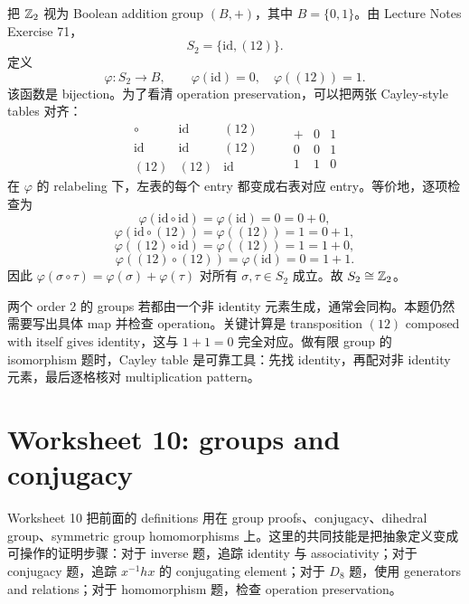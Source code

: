 \begin{solution}
把 \(\mathbb{Z}_2\) 视为 Boolean addition group \((B,+)\)，其中 \(B=\{0,1\}\)。由 Lecture Notes Exercise 71，
\[
  S_2=\{\mathrm{id},(12)\}.
\]
定义
\[
  \varphi:S_2\to B,\qquad
  \varphi(\mathrm{id})=0,\quad \varphi((12))=1.
\]
该函数是 bijection。为了看清 operation preservation，可以把两张 Cayley-style tables 对齐：
\[
\begin{array}{c|cc}
\circ&\mathrm{id}&(12)\\ \hline
\mathrm{id}&\mathrm{id}&(12)\\
(12)&(12)&\mathrm{id}
\end{array}
\qquad
\begin{array}{c|cc}
+&0&1\\ \hline
0&0&1\\
1&1&0
\end{array}
\]
在 \(\varphi\) 的 relabeling 下，左表的每个 entry 都变成右表对应 entry。等价地，逐项检查为
\[
  \varphi(\mathrm{id}\circ\mathrm{id})=\varphi(\mathrm{id})=0=0+0,
\]
\[
  \varphi(\mathrm{id}\circ(12))=\varphi((12))=1=0+1,
\]
\[
  \varphi((12)\circ\mathrm{id})=\varphi((12))=1=1+0,
\]
\[
  \varphi((12)\circ(12))=\varphi(\mathrm{id})=0=1+1.
\]
因此 \(\varphi(\sigma\circ\tau)=\varphi(\sigma)+\varphi(\tau)\) 对所有 \(\sigma,\tau\in S_2\) 成立。故 \(S_2\cong\mathbb{Z}_2\)。
\end{solution}

\begin{explanation}
两个 order \(2\) 的 groups 若都由一个非 identity 元素生成，通常会同构。本题仍然需要写出具体 map 并检查 operation。关键计算是 transposition \((12)\) composed with itself gives identity，这与 \(1+1=0\) 完全对应。做有限 group 的 isomorphism 题时，Cayley table 是可靠工具：先找 identity，再配对非 identity 元素，最后逐格核对 multiplication pattern。
\end{explanation}

\section{Worksheet 10: groups and conjugacy}

Worksheet 10 把前面的 definitions 用在 group proofs、conjugacy、dihedral group、symmetric group homomorphisms 上。这里的共同技能是把抽象定义变成可操作的证明步骤：对于 inverse 题，追踪 identity 与 associativity；对于 conjugacy 题，追踪 \(x^{-1}hx\) 的 conjugating element；对于 \(D_8\) 题，使用 generators and relations；对于 homomorphism 题，检查 operation preservation。

